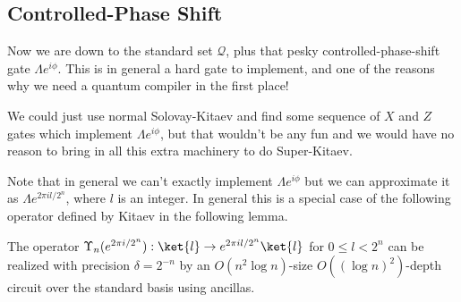 \subsection{Controlled-Phase Shift}
\label{subsec:phase-shift}

Now we are down to the standard set $\mathcal{Q}$, plus that pesky
controlled-phase-shift gate $\Lambda{e^{i\phi}}$. This is in general a hard
gate to implement, and one of the reasons why we need a quantum compiler in
the first place!

We could just use normal Solovay-Kitaev and find some sequence of $X$ and
$Z$ gates which implement $\Lambda{e^{i\phi}}$, but that wouldn't be any
fun and we would have no reason to bring in all this extra machinery to
do Super-Kitaev.

Note that in general we can't exactly implement $\Lambda{e^{i\phi}}$ but we
can approximate it as $\Lambda{e^{2\pi i l / 2^n}}$, where $l$ is an integer.
In general this is a special case of the following operator
defined by Kitaev in the following lemma.

\begin{theorem}[Lemma 13.4]
The operator 
$\Upsilon_n(e^{2\pi i / 2^n}) : \ket{l} \rightarrow e^{2\pi i l / 2^n} \ket{l}$
for $0 \le l < 2^n$ can be realized with precision $\delta = 2^{-n}$ by an
$O(n^2 \log n)$-size $O((\log n)^2)$-depth circuit over the standard basis
using ancillas.
\end{theorem}

